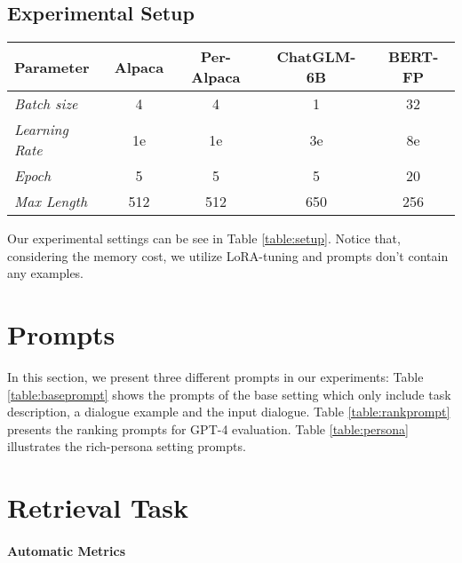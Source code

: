 \documentclass[11pt]{article}
\begin{document}
\subsection{Experimental Setup}
\begin{table*}[t]
\footnotesize
    \centering
{
    \begin{tabular}{l c c cc}
    \toprule
\textbf{Parameter} &  Alpaca & Per-Alpaca & ChatGLM-6B  & BERT-FP \\
    \midrule
  
    \textit{Batch size}  & 4 & 4 & 1 & 32 \\

\textit{Learning Rate} &  1e & 1e &3e & 8e \\

\textit{Epoch} & 5&5 & 5 & 20 \\

\textit{Max Length} & 512 & 512 & 650 & 256 \\

    \bottomrule
    \end{tabular}
    }
    \vspace{-2mm}
    \caption{Hyper-parameters setup in fine-tuning.
    } 
    \label{table:setup}
    \vspace{-3mm}
\end{table*} Our experimental settings can be see in Table \ref{table:setup}. Notice that, considering the memory cost, we utilize LoRA-tuning \cite{hu2021lora} and prompts  don't contain any examples.



\section{Prompts}
\label{all_prompts}
In this section, we present three different prompts in our experiments: Table \ref{table:baseprompt} shows the prompts of the base setting which only include task description,  a dialogue example and the input dialogue. Table \ref{table:rankprompt} presents the ranking prompts for GPT-4 evaluation. Table \ref{table:persona} illustrates the rich-persona setting prompts.

\section{Retrieval Task}
\label{metric}

\paragraph{Automatic Metrics}
\end{document}
